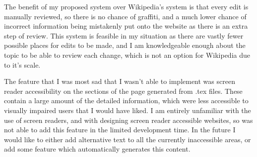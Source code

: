 \documentclass{l4proj}
\begin{document}
The benefit of my proposed system over Wikipedia's system is that every edit is manually reviewed, so there is no chance of graffiti, and a much lower chance of incorrect information being mistakenly put onto the website as there is an extra step of review.  This system is feasible in my situation as there are vastly fewer possible places for edits to be made, and I am knowledgeable enough about the topic to be able to review each change, which is not an option for Wikipedia due to it's scale.

The feature that I was most sad that I wasn't able to implement was screen reader accessibility on the sections of the page generated from .tex files.  These contain a large amount of the detailed information, which were less accessible to visually impaired users that I would have liked.  I am entirely unfamiliar with the use of screen readers, and with designing screen reader accessible websites, so was not able to add this feature in the limited development time.  In the future I would like to either add alternative text to all the currently inaccessible areas, or add some feature which automatically generates this content.

%
% 
\end{document}
